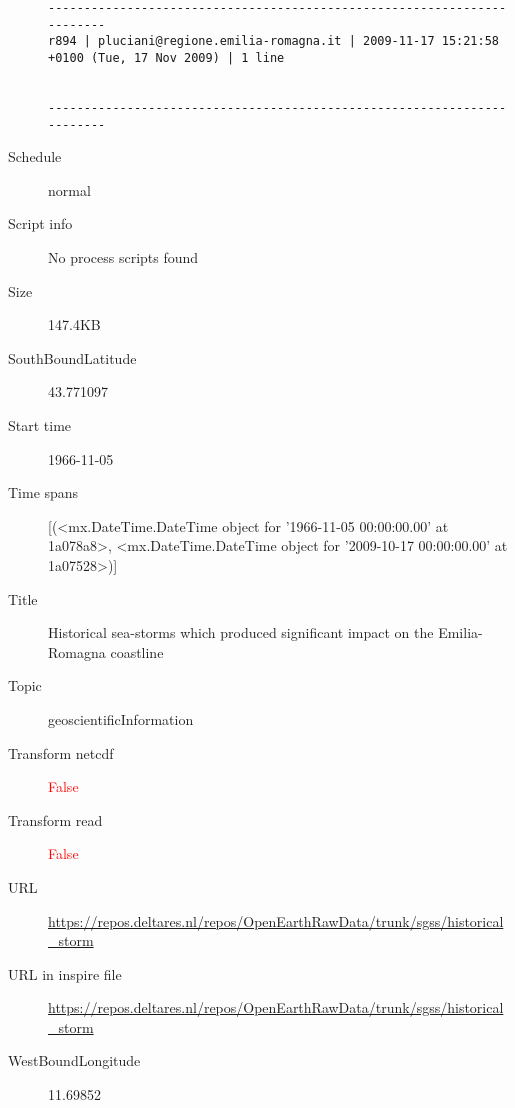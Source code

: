 \documentclass[9]{report}
\begin{document}
\begin{description}
\begin{verbatim}
------------------------------------------------------------------------
r894 | pluciani@regione.emilia-romagna.it | 2009-11-17 15:21:58 +0100 (Tue, 17 Nov 2009) | 1 line


------------------------------------------------------------------------

\end{verbatim}
  \item[Schedule] normal
  \item[Script info] No process scripts found
  \item[Size] 147.4KB
  \item[SouthBoundLatitude] 43.771097
  \item[Start time] 1966-11-05
  \item[Time spans] [(<mx.DateTime.DateTime object for '1966-11-05 00:00:00.00' at 1a078a8>, <mx.DateTime.DateTime object for '2009-10-17 00:00:00.00' at 1a07528>)]
  \item[Title]  Historical sea-storms which produced significant impact on the Emilia-Romagna coastline 
  \item[Topic] geoscientificInformation
  \item[Transform netcdf] \textcolor{red}{False}
  \item[Transform read] \textcolor{red}{False}
  \item[URL] \href{https://repos.deltares.nl/repos/OpenEarthRawData/trunk/sgss/historical\_storm}{https://repos.deltares.nl/repos/OpenEarthRawData/trunk/sgss/historical\_storm}
  \item[URL in inspire file] \href{https://repos.deltares.nl/repos/OpenEarthRawData/trunk/sgss/historical\_storm}{https://repos.deltares.nl/repos/OpenEarthRawData/trunk/sgss/historical\_storm}
  \item[WestBoundLongitude] 11.69852
\end{description}
\end{document}
